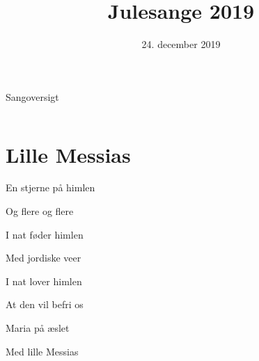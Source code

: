 \documentclass[11pt]{beamer}
\author{}
\title{Julesange 2019}
\date{24. december 2019}
\begin{document}
\begin{frame}
\titlepage
\end{frame}





\newcommand{\xmastree}{\begin{tikzpicture}
\begin{axis}[
    hide axis, clip=false,
    y domain=0:2*pi,
    samples=30,axis equal, view={65}{20}]
\addplot3 [domain=0:4,surf,shader=flat,z buffer=sort,fill=green!50!brown, draw=green!50!black, line join=bevel] 
    ({(1.3*x-floor(x))*x^0.5*cos(deg(y))},
     {(1.3*x-floor(x))*x^0.5*sin(deg(y))},
     {-5*x});
\addplot3 [domain=0:4.5, samples=10, samples y=0, fill=yellow!85!red, draw=yellow!55!red] ({0},{sin(x/5*360) * (1 - x + floor(x)) },{cos(x/5*360) * (1 - x + floor(x) )  + 0.5}) -- cycle;
\end{axis}
\end{tikzpicture}}

\newcommand{\toc}{\begin{frame}{Sangoversigt}
\begin{columns}
	\begin{column}{0.05\textwidth}
	\end{column}
	\begin{large}
		\begin{column}{0.65\textwidth}
    	    \tableofcontents
    	\end{column}

	\end{large}
    
    \begin{column}{0.30\textwidth}
    	\begin{center}
    	\end{center}
    \end{column}
\end{columns}



\end{frame}}


\toc

\section{Lille Messias}
\huge
\center
\begin{frame}
En stjerne på himlen

Og flere og flere

I nat føder himlen

Med jordiske veer

I nat lover himlen

At den vil befri os

Maria på æslet

Med lille Messias
\end{frame}
\end{document}
